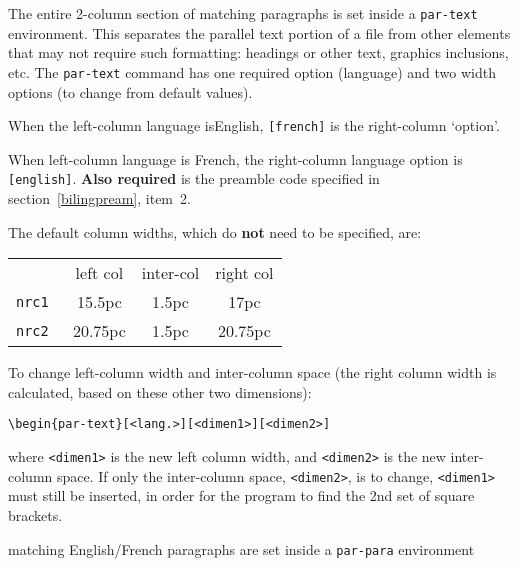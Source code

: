 \begin{description} \itemsep=0pt
   \item [lines 1, 13:] The entire 2-column section of matching
         paragraphs is set inside a \verb|par-text| environment. This
         separates the parallel text portion of a file from other
         elements that may not require such formatting: headings or
         other text, graphics inclusions, etc. The \verb|par-text|
         command has one required option (language) and two width
         options (to change from default values).

   \item [line 1: \tt{[<language>]}] When the left-column language
         is\break English, \verb|[french]| is the right-column
         `option'.

         When left-column language is French, the right-column
         language option is \verb|[english]|. {\bf Also required} is
         the preamble code specified in section~\ref{bilingpream},
         item~2.

   \item [line 1:] The default column widths, which do {\bf not} need
         to be specified, are:

   \hspace{1pc}\begin{tabular}{lccc}
             & left col & inter-col & right col \\ [2pt]
    \tt nrc1 &  15.5pc  & 1.5pc     & 17pc    \\
    \tt nrc2 &  20.75pc & 1.5pc     & 20.75pc \\
   \end{tabular}

         To change left-column width and inter-column space (the right
         column width is calculated, based on these other two
         dimensions): 

\begin{verbatim}
\begin{par-text}[<lang.>][<dimen1>][<dimen2>]
\end{verbatim}

         where \verb|<dimen1>| is the new left column width, and
         \verb|<dimen2>| is the new inter-column space. If only the
         inter-column space, \verb|<dimen2>|, is to change,
         \verb|<dimen1>| must still be inserted, in order for the
         program to find the 2nd set of square brackets.

   \item [lines 2 and 6:] matching English/French paragraphs are set
         inside a \verb|par-para| environment


\end{description}
